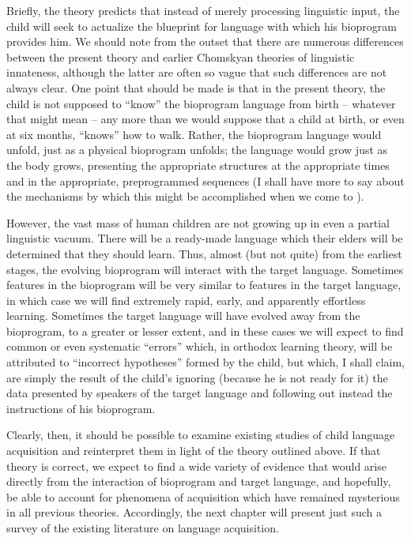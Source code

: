 Briefly, the theory predicts that instead of merely processing linguistic input, the child will seek to actualize the blueprint for language with which his bioprogram provides him. We should note from the outset that there are numerous differences between the present theory and earlier Chomskyan theories of linguistic innateness, although the latter are often so vague that such differences are not always clear. One point that should be made is that in the present theory, the child is not supposed to ``know'' the bioprogram language from birth -- whatever that might mean -- any more than we would suppose that a child at birth, or even at six months, ``knows'' how to walk.
Rather, the bioprogram language would unfold, just as a physical bioprogram unfolds; the language would grow just as the body grows, presenting the appropriate structures at the appropriate times and in the appropriate, preprogrammed sequences (I shall have more to say about the mechanisms by which this might be accomplished when we come to ).

However, the vast mass of human children are not growing up in even a partial linguistic vacuum. There will be a ready-made language which their elders will be determined that they should learn. Thus, almost (but not quite) from the earliest stages, the evolving bioprogram will interact with the target language. Sometimes features in the bioprogram will be very similar to features in the target language, in which case we will find extremely rapid, early, and apparently effortless learning. Sometimes the target language will have evolved away from the bioprogram, to a greater or lesser extent, and in these cases we will expect to find common or even systematic ``errors'' which, in orthodox learning theory, will be attributed to ``incorrect hypotheses'' formed by the child, but which, I shall claim, are simply the result of the child's ignoring (because he is not ready for it) the data presented by speakers of the target language and following out instead the instructions of his bioprogram.
 
Clearly, then, it should be possible to examine existing studies of child language acquisition and reinterpret them in light of the theory outlined above. If that theory is correct, we expect to find a wide variety of evidence that would arise directly from the interaction of bioprogram and target language, and hopefully, be able to account for phenomena of acquisition which have remained mysterious in all previous theories. Accordingly, the next chapter will present just such a survey of the existing literature on language acquisition.